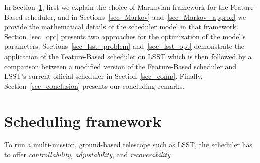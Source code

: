 \documentclass[11pt]{article}
\theoremstyle{definition}
\begin{document}
In Section~\ref{sec_SM}, first we explain the choice of Markovian framework for the Feature-Based scheduler, and in Sections~\ref{sec_Markov} and~\ref{sec_Markov_approx} we provide the mathematical details of the scheduler model in that framework. Section~\ref{sec_opt} presents two approaches for the optimization of the model's parameters. Sections~\ref{sec_lsst_problem} and~\ref{sec_lsst_opt} demonstrate the application of the Feature-Based scheduler on LSST which is then followed by a comparison between a modified version of the Feature-Based scheduler and LSST's current official scheduler in Section~\ref{sec_comp}. Finally, Section~\ref{sec_conclusion} presents our concluding remarks.

\section{Scheduling framework}\label{sec_SM}
To run a multi-mission, ground-based telescope such as LSST, the scheduler has to offer \textit{controllability}, \textit{adjustability}, and \textit{recoverability}.
\end{document}
